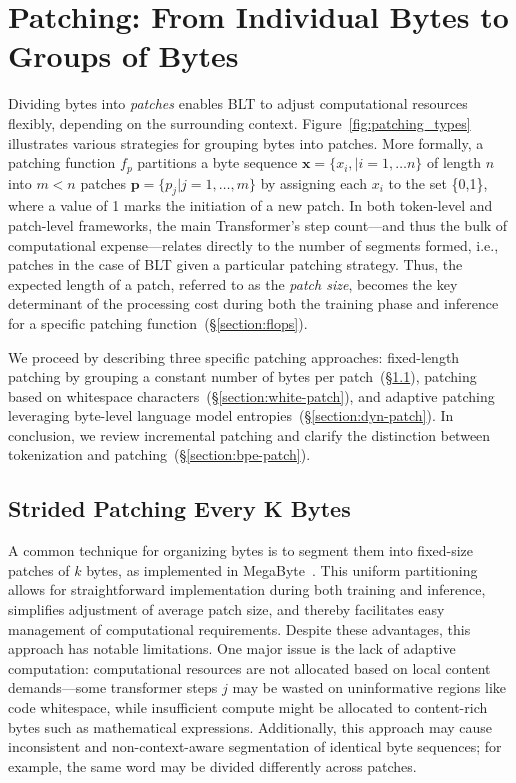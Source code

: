 \section{Patching: From Individual Bytes to Groups of Bytes}
\label{section:patching}

Dividing bytes into \textit{patches} enables {\textsc BLT} to adjust computational resources flexibly, depending on the surrounding context. Figure~\ref{fig:patching_types} illustrates various strategies for grouping bytes into patches. More formally, a patching function $f_p$ partitions a byte sequence $\pmb{x}=\{x_i,|i=1,\ldots n\}$ of length $n$ into $m < n$ patches $\pmb{p}=\{p_j|j=1,\ldots,m\}$ by assigning each $x_i$ to the set \{0,1\}, where a value of 1 marks the initiation of a new patch. In both token-level and patch-level frameworks, the main Transformer’s step count—and thus the bulk of computational expense—relates directly to the number of segments formed, i.e., patches in the case of {\textsc BLT} given a particular patching strategy. Thus, the expected length of a patch, referred to as the \textit{patch size}, becomes the key determinant of the processing cost during both the training phase and inference for a specific patching function~(\S\ref{section:flops}).

We proceed by describing three specific patching approaches: fixed-length patching by grouping a constant number of bytes per patch~(\S\ref{section:static-patch}), patching based on whitespace characters~(\S\ref{section:white-patch}), and adaptive patching leveraging byte-level language model entropies~(\S\ref{section:dyn-patch}). In conclusion, we review incremental patching and clarify the distinction between tokenization and patching~(\S\ref{section:bpe-patch}).

\subsection{Strided Patching Every K Bytes}
\label{section:static-patch}

A common technique for organizing bytes is to segment them into fixed-size patches of $k$ bytes, as implemented in MegaByte~\citep{yu2023megabyte}. This uniform partitioning allows for straightforward implementation during both training and inference, simplifies adjustment of average patch size, and thereby facilitates easy management of computational requirements. Despite these advantages, this approach has notable limitations. One major issue is the lack of adaptive computation: computational resources are not allocated based on local content demands—some transformer steps $j$ may be wasted on uninformative regions like code whitespace, while insufficient compute might be allocated to content-rich bytes such as mathematical expressions. Additionally, this approach may cause inconsistent and non-context-aware segmentation of identical byte sequences; for example, the same word may be divided differently across patches.

